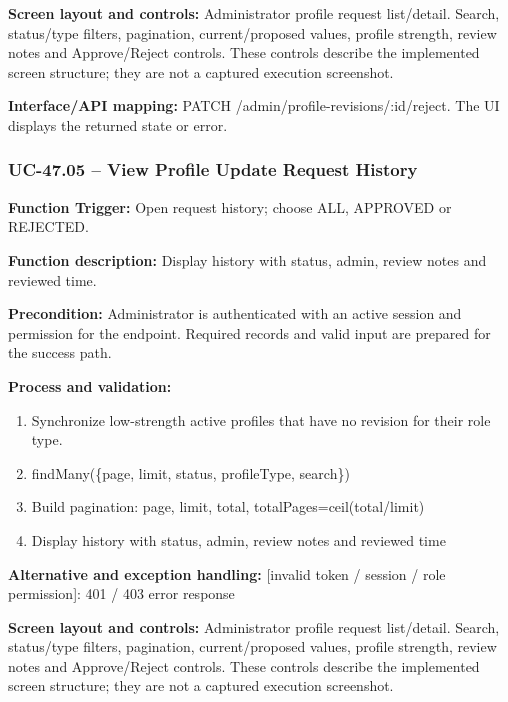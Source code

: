 \textbf{Screen layout and controls:} Administrator profile request list/\allowbreak{}detail. Search, status/\allowbreak{}type filters, pagination, current/\allowbreak{}proposed values, profile strength, review notes and Approve/\allowbreak{}Reject controls. These controls describe the implemented screen structure; they are not a captured execution screenshot.

\textbf{Interface/\allowbreak{}API mapping:} PATCH /\allowbreak{}admin/\allowbreak{}profile-revisions/\allowbreak{}:id/\allowbreak{}reject. The UI displays the returned state or error.

\subsubsection{UC-47.05 -- View Profile Update Request History}
\textbf{Function Trigger:} Open request history; choose ALL, APPROVED or REJECTED.

\textbf{Function description:} Display history with status, admin, review notes and reviewed time.

\textbf{Precondition:} Administrator is authenticated with an active session and permission for the endpoint. Required records and valid input are prepared for the success path.

\textbf{Process and validation:}
\begin{enumerate}
\item Synchronize low-strength active profiles that have no revision for their role type.
\item find\allowbreak{}Many(\{page, limit, status, profile\allowbreak{}Type, search\})
\item Build pagination: page, limit, total, total\allowbreak{}Pages=\allowbreak{}ceil(total/\allowbreak{}limit)
\item Display history with status, admin, review notes and reviewed time
\end{enumerate}
\textbf{Alternative and exception handling:} [invalid token /\allowbreak{} session /\allowbreak{} role permission]: 401 /\allowbreak{} 403 error response

\textbf{Screen layout and controls:} Administrator profile request list/\allowbreak{}detail. Search, status/\allowbreak{}type filters, pagination, current/\allowbreak{}proposed values, profile strength, review notes and Approve/\allowbreak{}Reject controls. These controls describe the implemented screen structure; they are not a captured execution screenshot.

